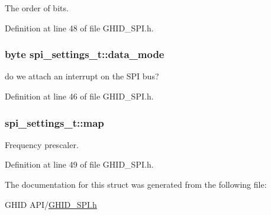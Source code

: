 \-The order of bits. 



\-Definition at line 48 of file \-G\-H\-I\-D\-\_\-\-S\-P\-I.\-h.

\hypertarget{structspi__settings__t_a4ef3b51bb59cd49b4ad291443d2e3404}{
\subsubsection[{data\-\_\-mode}]{\setlength{\rightskip}{0pt plus 5cm}byte {\bf spi\-\_\-settings\-\_\-t\-::data\-\_\-mode}}}\label{structspi__settings__t_a4ef3b51bb59cd49b4ad291443d2e3404}


do we attach an interrupt on the \-S\-P\-I bus? 



\-Definition at line 46 of file \-G\-H\-I\-D\-\_\-\-S\-P\-I.\-h.

\hypertarget{structspi__settings__t_a177d7128802b522adf4b1b9748787fb5}{
\subsubsection[{map}]{ {\bf spi\-\_\-settings\-\_\-t\-::map}}}\label{structspi__settings__t_a177d7128802b522adf4b1b9748787fb5}


\-Frequency prescaler. 



\-Definition at line 49 of file \-G\-H\-I\-D\-\_\-\-S\-P\-I.\-h.



\-The documentation for this struct was generated from the following file\-:\begin{DoxyCompactItemize}
\item 
\-G\-H\-I\-D A\-P\-I/\hyperlink{_g_h_i_d___s_p_i_8h}{\-G\-H\-I\-D\-\_\-\-S\-P\-I.\-h}\end{DoxyCompactItemize}
